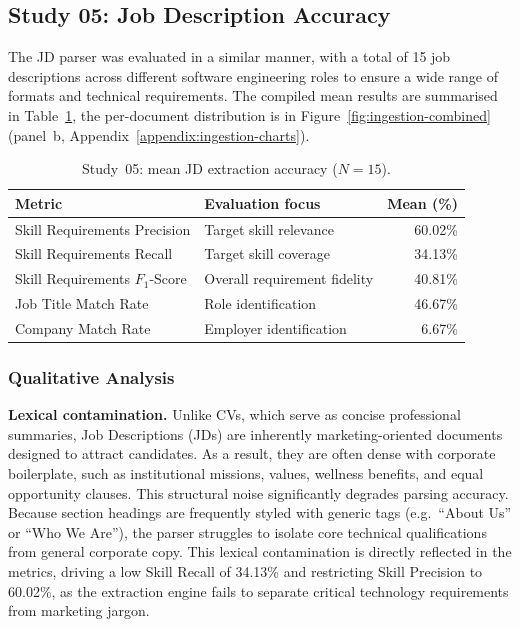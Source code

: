 \subsection{Study 05: Job Description Accuracy}
\label{subsec:study-05}
The JD parser was evaluated in a similar manner, with a total of 15 job descriptions across different software
engineering roles to ensure a wide range of formats and technical requirements. The compiled mean results
are summarised in Table~\ref{tab:jd_parser_results}, the per-document distribution is in
Figure~\ref{fig:ingestion-combined} (panel~b, Appendix~\ref{appendix:ingestion-charts}).

\begin{table}[htbp]
    \centering
    \caption[Study~05: JD extraction accuracy]{Study~05: mean JD extraction accuracy ($N=15$).}
    \label{tab:jd_parser_results}
    \merittablesize
    \setlength{\tabcolsep}{6pt}
    \begin{tabular}{l l r}
        \toprule
        \textbf{Metric} & \textbf{Evaluation focus} & \textbf{Mean (\%)} \\
        \midrule
        Skill Requirements Precision   & Target skill relevance       & 60.02\% \\
        Skill Requirements Recall      & Target skill coverage        & 34.13\% \\
        Skill Requirements $F_1$-Score & Overall requirement fidelity & 40.81\% \\
        Job Title Match Rate           & Role identification        & 46.67\% \\
        Company Match Rate             & Employer identification    & 6.67\%  \\
        \bottomrule
    \end{tabular}
\end{table}

\subsubsection{Qualitative Analysis}

\textbf{Lexical contamination.} Unlike CVs, which serve as concise professional summaries, Job Descriptions (JDs) are inherently
marketing-oriented documents designed to attract candidates. As a result, they are often dense with corporate
boilerplate, such as institutional missions, values, wellness benefits, and equal opportunity clauses.
This structural noise significantly degrades parsing accuracy. Because section headings are frequently
styled with generic tags (e.g.\ ``About Us'' or ``Who We Are''), the parser struggles to isolate core technical
qualifications from general corporate copy. This lexical contamination is directly reflected in the metrics,
driving a low Skill Recall of 34.13\% and restricting Skill Precision to 60.02\%, as the extraction engine
fails to separate critical technology requirements from marketing jargon.


